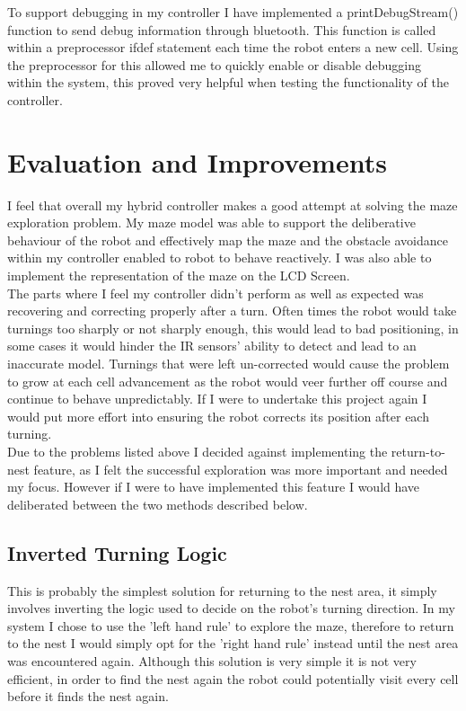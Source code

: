 \documentclass[a4paper]{article}
\begin{document}
	To support debugging in my controller I have implemented a printDebugStream() function to send debug information through bluetooth. This function is called within a preprocessor ifdef statement each time the robot enters a new cell. Using the preprocessor for this allowed me to quickly enable or disable debugging within the system, this proved very helpful when testing the functionality of the controller.
	
	\newpage
	
	\section{Evaluation and Improvements}
	I feel that overall my hybrid controller makes a good attempt at solving the maze exploration problem. My maze model was able to support the deliberative behaviour of the robot and effectively map the maze and the obstacle avoidance within my controller enabled to robot to behave reactively. I was also able to implement the representation of the maze on the LCD Screen.\\
	
	The parts where I feel my controller didn't perform as well as expected was recovering and correcting properly after a turn. Often times the robot would take turnings too sharply or not sharply enough, this would lead to bad positioning, in some cases it would hinder the IR sensors' ability to detect and lead to an inaccurate model. Turnings that were left un-corrected would cause the problem to grow at each cell advancement as the robot would veer further off course and continue to behave unpredictably. If I were to undertake this project again I would put more effort into ensuring the robot corrects its position after each turning.\\
	
	Due to the problems listed above I decided against implementing the return-to-nest feature, as I felt the successful exploration was more important and needed my focus. However if I were to have implemented this feature I would have deliberated between the two methods described below.
	
	\subsection{Inverted Turning Logic}
	This is probably the simplest solution for returning to the nest area, it simply involves inverting the logic used to decide on the robot's turning direction. In my system I chose to use the 'left hand rule' to explore the maze, therefore to return to the nest I would simply opt for the 'right hand rule' instead until the nest area was encountered again. Although this solution is very simple it is not very efficient, in order to find the nest again the robot could potentially visit every cell before it finds the nest again.\\
	
\end{document}

